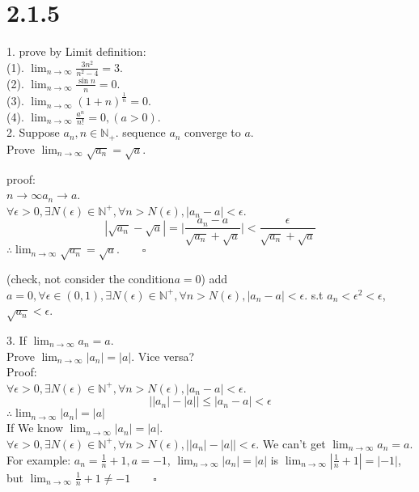 \section{2.1.5}
1. prove by Limit definition:\\
(1). $ \lim_{n\rightarrow\infty}\frac{3n^2}{n^2-4} = 3 $.\\
(2). $ \lim_{n\rightarrow\infty}\frac{\sin n}{n} = 0 $.\\
(3). $ \lim_{n\rightarrow\infty}(1+n)^\frac{1}{n} = 0 $.\\
(4). $ \lim_{n\rightarrow\infty}\frac{a^n}{n!} = 0, (a>0) $.\\

2. Suppose $ a_n, n\in\mathbb{N}_+ $. sequence {$ a_n $} converge to $ a $.\\ Prove $ \lim_{n\rightarrow\infty}\sqrt{a_n} = \sqrt{a} $.

proof:\\
$ n\rightarrow\infty  a_n \rightarrow a $.\\
$ \forall \epsilon >0, \exists N(\epsilon) \in \mathbb{N}^+, \forall n>N(\epsilon), |a_n - a|<\epsilon $.
\begin{equation*}
	|\sqrt{a_n}-\sqrt{a}| = \Big|\frac{a_n-a}{\sqrt{a_n}+\sqrt{a}}\Big| < \frac{\epsilon}{\sqrt{a_n}+\sqrt{a}}
\end{equation*}
$ \therefore \lim_{n\rightarrow\infty}\sqrt{a_n} = \sqrt{a}. \qquad\square  $

(check, not consider the condition$ a=0 $)
add $ a=0, \forall \epsilon \in (0,1), \exists N(\epsilon) \in \mathbb{N}^+, \forall n>N(\epsilon), |a_n - a|<\epsilon $. s.t $ a_n<\epsilon^2 <\epsilon $, $ \sqrt{a_n} < \epsilon $.

3. If $ \lim_{n\rightarrow\infty} a_n = a $.\\ Prove $ \lim_{n\rightarrow\infty} |a_n| = |a| $. Vice versa?\\

Proof:\\
$ \forall \epsilon>0, \exists N(\epsilon) \in \mathbb{N}^+, \forall n>N(\epsilon), |a_n - a| <\epsilon$. 
\begin{equation*}
	\Big| |a_n| - |a| \Big| \le |a_n - a| <\epsilon
\end{equation*}
$ \therefore \lim_{n\rightarrow\infty} |a_n| = |a| $\\
If We know $ \lim_{n\rightarrow\infty} |a_n| = |a| $.\\
$ \forall \epsilon>0, \exists N(\epsilon) \in \mathbb{N}^+, \forall n>N(\epsilon), \big||a_n| - |a|\big| <\epsilon$.  We can't get $ \lim_{n\rightarrow\infty} a_n = a $. For example: $ a_n = \frac{1}{n}+1, a = -1 $, $ \lim_{n\rightarrow\infty} |a_n| = |a| $ is $ \lim_{n\rightarrow\infty} |\frac{1}{n}+1| = |-1| $, but $ \lim_{n\rightarrow\infty} \frac{1}{n}+1 \neq -1 \qquad\square $\\

